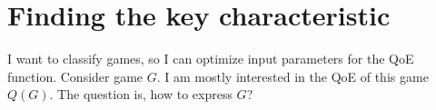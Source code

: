 
\section{Finding the key characteristic}


I want to classify games, so I can optimize input parameters for the QoE function. Consider game $G$. I am mostly interested in the QoE of this game $Q(G)$. The question is, how to express $G$?